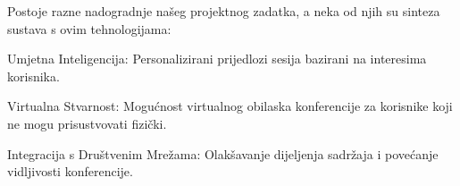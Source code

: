 		\newpage
		
		Postoje razne nadogradnje našeg projektnog zadatka, a neka od njih su sinteza sustava s ovim tehnologijama:
		\begin{packed_item}
			\item Umjetna Inteligencija: Personalizirani prijedlozi sesija bazirani na interesima korisnika.
			\item Virtualna Stvarnost: Mogućnost virtualnog obilaska konferencije za korisnike koji ne mogu prisustvovati fizički.
			\item Integracija s Društvenim Mrežama: Olakšavanje dijeljenja sadržaja i povećanje vidljivosti konferencije.
		\end{packed_item}

		
		
		\eject
		
		
	